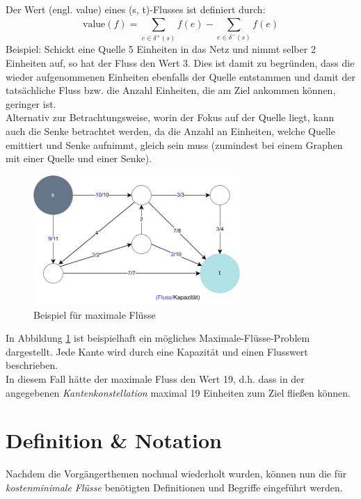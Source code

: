 Der Wert (engl. value) eines (s, t)-Flusses ist definiert durch:
\begin{equation}
    \textrm{value}(f) = \displaystyle\sum_{e \in \delta ^{+} (s)}^{} f(e) - \displaystyle\sum_{e \in \delta ^{-} (s)}^{} f(e)
    \label{formular:flusswert}
\end{equation}
Beispiel: Schickt eine Quelle 5 Einheiten in das Netz und nimmt selber 2 Einheiten auf, so hat der Fluss den Wert 3. Dies ist damit zu begründen, dass die wieder aufgenommenen Einheiten ebenfalls der Quelle entstammen und damit der tatsächliche Fluss bzw. die Anzahl Einheiten, die am Ziel ankommen können, geringer ist.\\
Alternativ zur Betrachtungsweise, worin der Fokus auf der Quelle liegt, kann auch die Senke betrachtet werden, da die Anzahl an Einheiten, welche Quelle emittiert und Senke aufnimmt, gleich sein muss (zumindest bei einem Graphen mit einer Quelle und einer Senke).

\begin{figure}[ht]
\centering
\includegraphics[width=0.7\textwidth]{img/philipp/graph1-Max Fluss.drawio.pdf}
\caption{Beispiel für maximale Flüsse}
\label{fig:maxfluss}
\end{figure}

In Abbildung \ref{fig:maxfluss} ist beispielhaft ein mögliches Maximale-Flüsse-Problem dargestellt. Jede Kante wird durch eine Kapazität und einen Flusswert beschrieben.\\
In diesem Fall hätte der maximale Fluss den Wert 19, d.h. dass in der angegebenen \textit{Kantenkonstellation} maximal 19 Einheiten zum Ziel fließen können.


\section{Definition \& Notation}

Nachdem die Vorgängerthemen nochmal wiederholt wurden, können nun die für \textit{kostenminimale Flüsse} benötigten Definitionen und Begriffe eingeführt werden.

